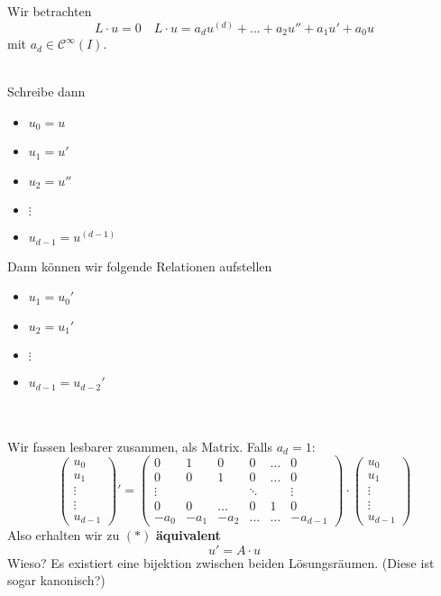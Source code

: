 \documentclass[main.tex]{subfiles}
\begin{document}
Wir betrachten
\begin{equation*}
  L \cdot u = 0 \quad L \cdot u = a_d u^{(d)} + ... + a_2 u'' + a_1 u' + a_0 u \tag{*}
\end{equation*}
mit $a_d \in \mathcal{C}^\infty(I)$.
\\\\
\begin{minipage}{0.5\textwidth}
  Schreibe dann
  \begin{itemize}
    \item $u_0 = u$
    \item $u_1 = u'$
    \item $u_2 = u ''$
    \item $\vdots$
    \item $u_{d-1} = u^{(d-1)}$
  \end{itemize}
\end{minipage}
\begin{minipage}{0.5\textwidth}
  Dann können wir folgende Relationen aufstellen
  \begin{itemize}
    \item $u_1 = u_0'$
    \item $u_2 = u_1'$
    \item $\vdots$
    \item $u_{d-1} = u_{d-2}'$
  \end{itemize}
\end{minipage}
\\\\
Wir fassen lesbarer zusammen, als Matrix. Falls $a_d = 1$:
$$\begin{pmatrix}
  u_0 \\ u_1 \\ \vdots \\ \vdots \\ u_{d-1}
\end{pmatrix}' = \begin{pmatrix}
  0 & 1 & 0 & 0 & \dots & 0 \\
  0 & 0 & 1 & 0 & \dots & 0 \\
  \vdots & & & \ddots & & \vdots \\
  0 & 0 & \dots & 0 & 1 & 0 \\
  -a_0 & -a_1 & -a_2 & \dots & \dots & -a_{d-1}
\end{pmatrix} \cdot \begin{pmatrix}
  u_0 \\ u_1 \\ \vdots \\ \vdots \\ u_{d-1}
\end{pmatrix}$$
Also erhalten wir zu $(*)$ \textbf{äquivalent}
$$u' = A \cdot u$$
Wieso? Es existiert eine bijektion zwischen beiden Lösungsräumen. (Diese ist sogar kanonisch?)
\end{document}
